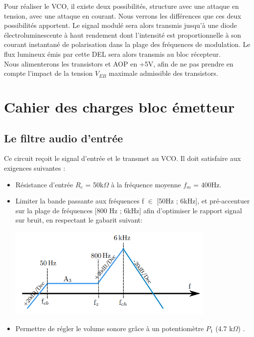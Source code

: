 \documentclass[a4paper]{report}
\begin{document}
\vspace{0.5cm}
Pour réaliser le VCO, il existe deux possibilités, structure avec une attaque en tension, avec une attaque en courant. Nous verrons les différences que ces deux possibilités apportent. Le signal modulé sera alors transmis jusqu'à une diode électroluminescente à haut rendement dont l'intensité est proportionnelle à son courant instantané de polarisation dans la plage des fréquences de modulation. Le flux lumineux émis par cette DEL sera alors transmis au bloc récepteur.\\
\vspace{0.5cm}
Nous alimenterons les transistors et AOP en +5V, afin de ne pas prendre en compte l'impact de la tension $V_{EB}$ maximale admissible des transistors.

\chapter{Cahier des charges bloc émetteur}

\section{Le filtre audio d'entrée}

Ce circuit reçoit le signal d'entrée et le transmet au VCO. Il doit satisfaire aux exigences suivantes :  
\begin{itemize}
	\item Résistance d'entrée $R_e$ = 50k$\Omega$ à la fréquence moyenne $f_m$ = 400Hz.

	\item Limiter la bande passante aux fréquences f $\in$ [50Hz ; 6kHz], et pré-accentuer sur la plage de fréquences [800 Hz ; 6kHz] afin d'optimiser le rapport signal sur bruit, en respectant le gabarit suivant:\\

\begin{center}
\includegraphics[width=0.8\textwidth]{gabarit.PNG}
\end{center}

	\item Permettre de régler le volume sonore grâce à un potentiomètre $P_1$ (4.7 k$\Omega$) .
	
\end{itemize}
\end{document}
